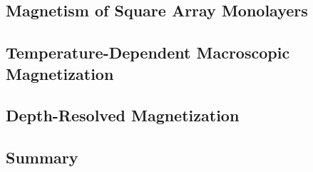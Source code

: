 \documentclass[\main/dresen_thesis.tex]{subfiles}
\renewcommand{\thisPath}{\main/chapters/monolayers/magnetism}
\begin{document}
  \subsection{Magnetism of Square Array Monolayers}
  \label{sec:monolayers:magneticStructure}
  

  
  \FloatBarrier
  
  \subsection{Temperature-Dependent Macroscopic Magnetization}
    
    \FloatBarrier

  \subsection{Depth-Resolved Magnetization}
    
    \FloatBarrier

  \subsection{Summary}
    
    \FloatBarrier
\end{document}
